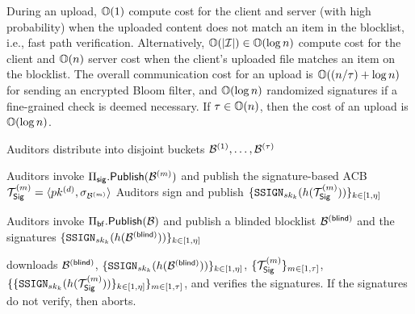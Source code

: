 During an upload, $\mathbb{O}(1)$ compute cost for the client and server (with high probability) when the uploaded content does not match an item in the blocklist, i.e., fast path verification. Alternatively, $\mathbb{O}(\left|{\mathcal{I}}\right|) \in \mathbb{O}(\log n)$ compute cost for the client and $\mathbb{O}(n)$ server cost when the client's uploaded file matches an item on the blocklist. The overall communication cost for an upload is $\mathbb{O}((n/\tau)+ \log n)$ for sending an encrypted Bloom filter, and $\mathbb{O}(\log n)$ randomized signatures if a fine-grained check is deemed necessary. If $\tau \in \mathbb{O}(n)$, then the cost of an upload is $\mathbb{O}(\log n)$. 




\begin{algorithm}[t]
\caption{\protocolEM: content moderation with exact matching}
\label{protocol:em}
\footnotesize
\begin{algorithmic}[1]

\Statex{}
\State Auditors distribute \blocklist into \numBlocklistParts disjoint buckets $\blocklistPartition{1}, \dots, \blocklistPartition{\numBlocklistParts}$ 

\State Auditors invoke $\sigACB.\publishList(\blocklistPartition{\partitionIdx})$ and publish the signature-based ACB $\sigBlklistToken{\partitionIdx} = \langle \auditorPubKeyOurScheme, \genericSig[\blocklistPartition{\partitionIdx}] \rangle$
\State Auditors sign and publish $\{ \signGenSig[\auditorPrivKeyGenericScheme[\auditorIdx]](\hashFn(\sigBlklistToken{\partitionIdx})) \}_{\auditorIdx \in [1, \numAuditors]}$
\EndFor

\Statex{}
\State Auditors invoke $\bfACB.\publishList(\blocklist)$ and publish a blinded blocklist $\blindedBlocklist$ and the signatures $\{ \signGenSig[\auditorPrivKeyGenericScheme[\auditorIdx]](\hashFn(\blindedBlocklist) ) \}_{\auditorIdx \in [1, \numAuditors]}$

\Statex{}

\State \client downloads $\blindedBlocklist$,  $\{ \signGenSig[\auditorPrivKeyGenericScheme[\auditorIdx]](\hashFn(\blindedBlocklist)) \}_{\auditorIdx \in [1, \numAuditors]}$, $\{\sigBlklistToken{\partitionIdx}\}_{\partitionIdx \in [1, \numBlocklistParts]}$, $\{ \{ \signGenSig[\auditorPrivKeyGenericScheme[\auditorIdx]](\hashFn(\sigBlklistToken{\partitionIdx})) \}_{\auditorIdx \in [1, \numAuditors]}\}_{\partitionIdx \in [1, \numBlocklistParts]}$, and verifies the signatures. If the signatures do not verify, then \client aborts. 


\end{algorithmic}
\end{algorithm}
